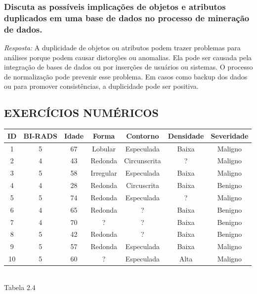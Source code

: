 \documentclass{article}
\begin{document}
\subsubsection{Discuta as possíveis implicações de objetos e atributos duplicados em uma base de dados no processo de mineração de dados.} 
\textit{Resposta:} A duplicidade de objetos ou atributos podem trazer problemas para análises porque podem causar distorções ou anomalias. Ela pode ser causada pela integração de bases de dados ou por inserções de usuários ou sistemas. O processo de normalização pode prevenir esse problema.
Em casos como backup dos dados ou para promover consistências, a duplicidade pode ser positiva.

\subsection{EXERCÍCIOS NUMÉRICOS}  
\begin{table}[H]
  \centering
  \begin{tabular}{|c|c|c|c|c|c|c|}
  \hline
  \rowcolor[HTML]{C0C0C0} 
  ID & BI-RADS & Idade & Forma     & Contorno     & Densidade & Severidade \\ \hline
  1  & 5       & 67    & Lobular   & Especulada   & Baixa     & Maligno    \\ \hline
  2  & 4       & 43    & Redonda   & Circunscrita & ?         & Maligno    \\ \hline
  3  & 5       & 58    & Irregular & Especulada   & Baixa     & Maligno    \\ \hline
  4  & 4       & 28    & Redonda   & Circuscrita  & Baixa     & Benigno    \\ \hline
  5  & 5       & 74    & Redonda   & Especulada   & ?         & Maligno    \\ \hline
  6  & 4       & 65    & Redonda   & ?            & Baixa     & Benigno    \\ \hline
  7  & 4       & 70    & ?         & ?            & Baixa     & Benigno    \\ \hline
  8  & 5       & 42    & Redonda   & ?            & Baixa     & Benigno    \\ \hline
  9  & 5       & 57    & Redonda   & Especulada   & Baixa     & Maligno    \\ \hline
  10 & 5       & 60    & ?         & Especulada   & Alta      & Maligno    \\ \hline
  \end{tabular} \\
  
  \textnormal{Tabela 2.4}
  \end{table}
\end{document}
